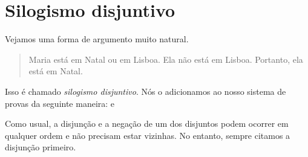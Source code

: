 
\section{Silogismo disjuntivo}
Vejamos uma forma de argumento muito natural.
	\begin{quote}
		Maria está em Natal ou em Lisboa. Ela não está em Lisboa. Portanto, ela está em Natal.
	\end{quote}
Isso é chamado  \emph{silogismo disjuntivo}. Nós o adicionamos ao nosso sistema de provas da seguinte maneira:
e

Como usual, a disjunção e a negação de um dos disjuntos podem ocorrer em qualquer ordem e não precisam estar vizinhas. No entanto, sempre citamos a disjunção primeiro.

